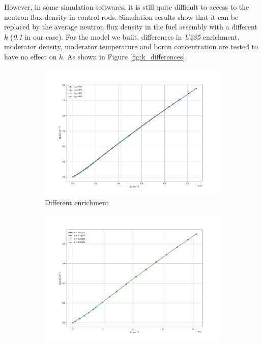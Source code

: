 However, in some simulation softwares, it is still quite difficult to access to the neutron flux density in control rods.
Simulation results show that it can be replaced by the average neutron flux density in the fuel assembly with a different $k$
(\textit{0.1} in our case).
For the model we built, differences in \textit{U235} enrichment, moderator density,
moderator temperature and boron concentration are tested
to have no effect on $k$. As shown in Figure \ref{fig:k_differences}.

\begin{figure}[!htb]
    \centering
    \begin{subfigure}[b]{.475\textwidth}
        \centering
        \includegraphics[width=\textwidth]{Figs/Bcr0_Bcr_difU.png}
        \caption{Different enrichment}
        \label{fig:diffU}
    \end{subfigure}%
    \hfill
    \begin{subfigure}[b]{.475\textwidth}
        \centering
        \includegraphics[width=\textwidth]{Figs/Bcr0_Bcr_difwd.png}

\end{subfigure}
\end{figure}

